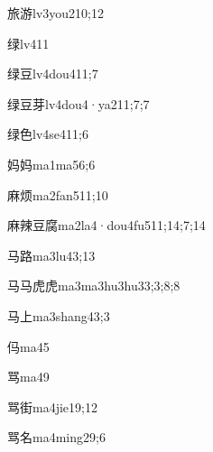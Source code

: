 \begin{verbete}{旅游}{lv3you2}{10;12}
\end{verbete}
\begin{verbete}{绿}{lv4}{11}
\end{verbete}
\begin{verbete}{绿豆}{lv4dou4}{11;7}
\end{verbete}
\begin{verbete}{绿豆芽}{lv4dou4·ya2}{11;7;7}
\end{verbete}
\begin{verbete}{绿色}{lv4se4}{11;6}
\end{verbete}
\begin{verbete}{妈妈}{ma1ma5}{6;6}
\end{verbete}
\begin{verbete}{麻烦}{ma2fan5}{11;10}
\end{verbete}
\begin{verbete}{麻辣豆腐}{ma2la4·dou4fu5}{11;14;7;14}
\end{verbete}
\begin{verbete}{马路}{ma3lu4}{3;13}
\end{verbete}
\begin{verbete}{马马虎虎}{ma3ma3hu3hu3}{3;3;8;8}
\end{verbete}
\begin{verbete}{马上}{ma3shang4}{3;3}
\end{verbete}
\begin{verbete}{㐷}{ma4}{5}
\end{verbete}
\begin{verbete}{骂}{ma4}{9}
\end{verbete}
\begin{verbete}{骂街}{ma4jie1}{9;12}
\end{verbete}
\begin{verbete}{骂名}{ma4ming2}{9;6}
\end{verbete}
